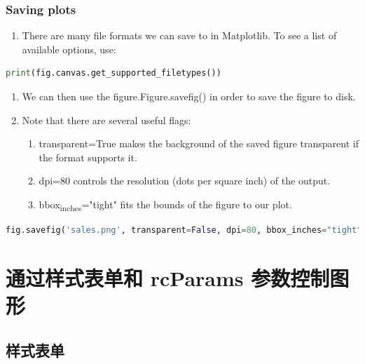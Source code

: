 \documentclass[UTF8,a4paper,12pt]{ctexart}  %
\providecommand{\tightlist}{\setlength{\itemsep}{0pt}\setlength{\parskip}{0pt}}
\begin{document}
\hypertarget{saving-plots}{%
\subsubsection{Saving plots}\label{saving-plots}}

\begin{enumerate}
\def\labelenumi{\arabic{enumi}.}
\tightlist
\item
  There are many file formats we can save to in Matplotlib. To see a
  list of available options, use:
\end{enumerate}

\begin{lstlisting}[language=Python]
print(fig.canvas.get_supported_filetypes())
\end{lstlisting}

\begin{enumerate}
\def\labelenumi{\arabic{enumi}.}
\tightlist
\item
  We can then use the figure.Figure.savefig() in order to save the
  figure to disk.
\item
  Note that there are several useful flags:

  \begin{enumerate}
  \def\labelenumii{\arabic{enumii}.}
  \tightlist
  \item
    transparent=True makes the background of the saved figure
    transparent if the format supports it.
  \item
    dpi=80 controls the resolution (dots per square inch) of the
    output.
  \item
    bbox\textsubscript{inches}="tight" fits the bounds of the figure to our
    plot.
  \end{enumerate}
\end{enumerate}

\begin{lstlisting}[language=Python]
fig.savefig('sales.png', transparent=False, dpi=80, bbox_inches="tight")
\end{lstlisting}

\hypertarget{ux901aux8fc7ux6837ux5f0fux8868ux5355ux548c-rcparams-ux53c2ux6570ux63a7ux5236ux56feux5f62}{%
\section{通过样式表单和 rcParams 参数控制图形}\label{ux901aux8fc7ux6837ux5f0fux8868ux5355ux548c-rcparams-ux53c2ux6570ux63a7ux5236ux56feux5f62}}

\hypertarget{ux6837ux5f0fux8868ux5355}{%
\subsection{样式表单}\label{ux6837ux5f0fux8868ux5355}}
\end{document}
